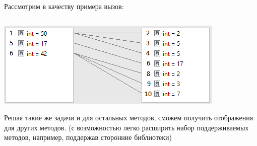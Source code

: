 \begin{frame}
\frametitle{\insertsection} 
\framesubtitle{\insertsubsection}
Рассмотрим в качеству примера вызов:
\inputminted{java}{code/FlatMapFactorizeExample.java}
\includegraphics[scale=0.8]{img/flatMapExample.png}

Решая такие же задачи и для остальных методов, сможем получить отображения для других методов. (с возможностью легко расширить набор поддерживаемых методов, например, поддержав сторонние библиотеки)
\end{frame}
